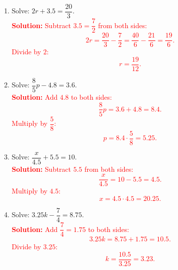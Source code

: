\documentclass[12pt]{article}
\begin{document}
\begin{tcolorbox}[colframe=black!60, colback=white, 
coltitle=black, colbacktitle=black!15, fonttitle=\bfseries\Large, 
title=Exercises (Part 2), halign title=center, left=10pt, right=10pt, top=10pt, bottom=5pt]
\begin{enumerate}[resume, itemsep=0.25em]
    \item Solve: \( 2r + 3.5 = \dfrac{20}{3} \).\\
    \textcolor{red}{\textbf{Solution:} Subtract \(3.5 = \dfrac{7}{2}\) from both sides: 
    \[
    2r = \dfrac{20}{3} - \dfrac{7}{2} = \dfrac{40}{6} - \dfrac{21}{6} = \dfrac{19}{6}.
    \] 
    Divide by \(2\): 
    \[
    r = \dfrac{19}{12}.
    \]}

    \item Solve: \( \dfrac{8}{5}p - 4.8 = 3.6 \).\\
    \textcolor{red}{\textbf{Solution:} Add \(4.8\) to both sides: 
    \[
    \dfrac{8}{5}p = 3.6 + 4.8 = 8.4.
    \] 
    Multiply by \(\dfrac{5}{8}\): 
    \[
    p = 8.4 \cdot \dfrac{5}{8} = 5.25.
    \]}

    \item Solve: \( \dfrac{x}{4.5} + 5.5 = 10 \).\\
    \textcolor{red}{\textbf{Solution:} Subtract \(5.5\) from both sides: 
    \[
    \dfrac{x}{4.5} = 10 - 5.5 = 4.5.
    \] 
    Multiply by \(4.5\): 
    \[
    x = 4.5 \cdot 4.5 = 20.25.
    \]}

    \item Solve: \( 3.25k - \dfrac{7}{4} = 8.75 \).\\
    \textcolor{red}{\textbf{Solution:} Add \(\dfrac{7}{4} = 1.75\) to both sides: 
    \[
    3.25k = 8.75 + 1.75 = 10.5.
    \] 
    Divide by \(3.25\): 
    \[
    k = \dfrac{10.5}{3.25} = 3.23.
    \]}
\end{enumerate}
\end{tcolorbox}
\end{document}

